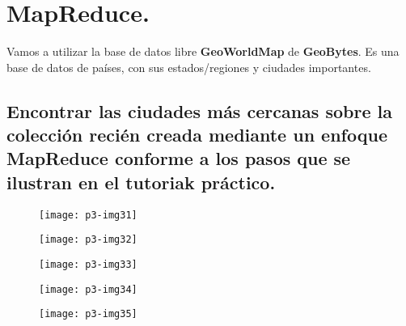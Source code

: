 \documentclass[10pt]{article}
\begin{document}
\section{MapReduce.}

Vamos a utilizar la base de datos libre \textbf{GeoWorldMap} de \textbf{GeoBytes}. Es una base de datos de países, con sus estados/regiones y ciudades importantes. 

\subsection{Encontrar las ciudades más cercanas sobre la colección recién creada mediante un enfoque MapReduce conforme a los pasos que se ilustran en el tutoriak práctico.}

\begin{figure}[H]
	\begin{center}
 		\texttt{[image: p3-img31]}
	\end{center} 
\end{figure}

\begin{figure}[H]
	\begin{center}
 		\texttt{[image: p3-img32]}
	\end{center} 
\end{figure}

\begin{figure}[H]
	\begin{center}
 		\texttt{[image: p3-img33]}
	\end{center} 
\end{figure}

\begin{figure}[H]
	\begin{center}
 		\texttt{[image: p3-img34]}
	\end{center} 
\end{figure}

\begin{figure}[H]
	\begin{center}
 		\texttt{[image: p3-img35]}
	\end{center} 
\end{figure}
\end{document}
